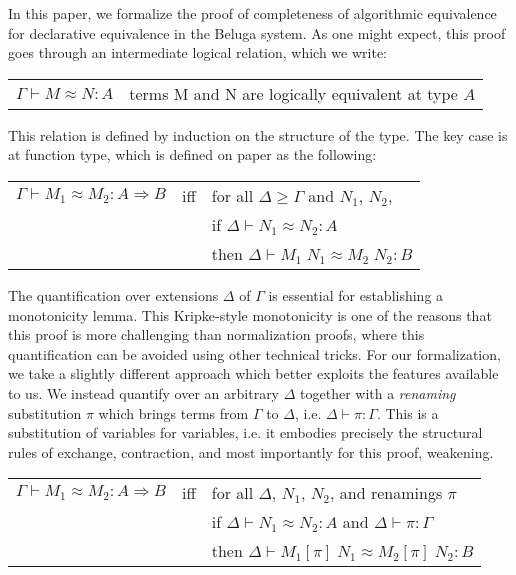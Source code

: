 \documentclass{article}
\begin{document}
In this paper, we formalize the proof of completeness of algorithmic equivalence for declarative
equivalence in the Beluga system. As one might expect, this proof goes
through an intermediate logical relation, which we write:

\begin{center}
  \begin{tabular}{@{}l@{~~~}l@{}}
$\Gamma \vdash M \approx N : A$ & terms M and N are logically equivalent at
type $A$ \\
  \end{tabular}
\end{center}

This relation is defined by induction on the structure of the
type. The key case is at function type, which is defined on paper as
the following:

\begin{center}
  \begin{tabular}{@{}l@{~~~}l@{~~~}l@{}}
$\Gamma \vdash M_1 \approx M_2 : A \Rightarrow B$ & iff & for all $\Delta \geq \Gamma$
and $N_1$, $N_2$, \\
& & if $\Delta \vdash N_1 \approx N_2 : A$\\
& & then $\Delta \vdash M_1\; N_1 \approx M_2\; N_2 : B$
  \end{tabular}
\end{center}

The quantification over extensions $\Delta$ of $\Gamma$ is essential
for establishing a monotonicity lemma. This Kripke-style monotonicity
is one of the reasons that this proof is more challenging than normalization proofs, where this
quantification can be avoided using other technical tricks. For
our formalization, we take a slightly different approach which 
better exploits the features available to us. We
instead quantify over an arbitrary $\Delta$ together with a
\emph{renaming} substitution $\pi$ which brings terms from $\Gamma$ to
$\Delta$, i.e. $\Delta \vdash \pi : \Gamma$. This is a substitution of
variables for variables, i.e. it embodies precisely the structural
rules of exchange, contraction, and most importantly for this proof, weakening.

\begin{center}
  \begin{tabular}{@{}l@{~~~}l@{~~~}l@{}}
$\Gamma \vdash M_1 \approx M_2 : A \Rightarrow B$ & iff & for all
$\Delta$, $N_1$, $N_2$, and renamings $\pi$ \\
& & if $\Delta \vdash N_1 \approx N_2 : A$ and $\Delta \vdash \pi : \Gamma$ \\
& & then $\Delta \vdash M_1[\pi]\; N_1 \approx M_2[\pi]\; N_2 : B$
  \end{tabular}
\end{center}
\end{document}
